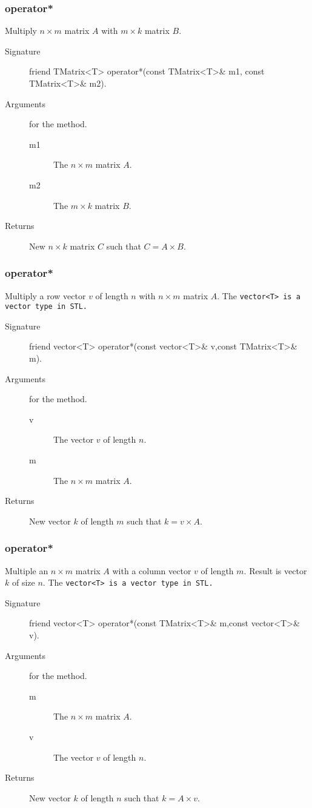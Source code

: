 \subsubsection{operator*}
Multiply $n \times m$ matrix $A$ with $m \times k$ matrix $B$.
\begin{description} 
  \item[Signature] friend TMatrix<T> operator*(const TMatrix<T>\& m1,
  const TMatrix<T>\& m2).
  \item[Arguments] for the method.
    \begin{description}
      \item [m1] The  $n \times m$ matrix $A$.
      \item [m2] The  $m \times k$ matrix $B$.
    \end{description}
   \item [Returns] New $n \times k$ matrix $C$ such that $C = A \times B$.
\end{description}

\subsubsection{operator*}

Multiply a row vector $v$ of length $n$ with $n \times m$ matrix $A$.
The \tt vector<T> \rm is a vector type in STL.
\begin{description}
  \item[Signature] friend vector<T> operator*(const vector<T>\&
   v,const TMatrix<T>\& m).
  \item[Arguments] for the method.
   \begin{description}
     \item [v] The vector $v$ of length $n$.
     \item [m] The $n \times m$ matrix $A$.
   \end{description} 
  \item [Returns] New vector $k$ of length $m$ such that  $k = v \times A$.
\end{description} 


\subsubsection{operator*}
Multiple an $n \times m$ matrix $A$ with a column vector $v$ of length $m$. 
Result is vector $k$ of size $n$. The \tt vector<T> \rm is a vector 
type in STL.

\begin{description}
  \item[Signature] friend vector<T> operator*(const TMatrix<T>\& m,const vector<T>\& v).
  \item[Arguments] for the method.
   \begin{description}
     \item [m] The $n \times m$ matrix $A$.
     \item [v] The vector $v$ of length $n$.
   \end{description} 
  \item [Returns] New vector $k$ of length $n$ such that  $k = A \times v$.
\end{description}


